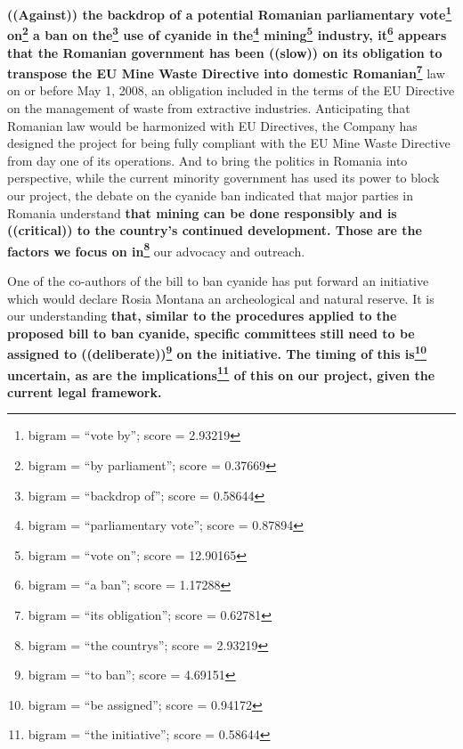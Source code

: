 \documentclass{article}
\begin{document}
 \textbf{((Against)) the backdrop of a potential Romanian parliamentary vote\footnote{bigram = ``vote by''; score = 2.93219} on\footnote{bigram = ``by parliament''; score = 0.37669} a ban on the\footnote{bigram = ``backdrop of''; score = 0.58644} use of cyanide in the\footnote{bigram = ``parliamentary vote''; score = 0.87894} mining\footnote{bigram = ``vote on''; score = 12.90165} industry, it\footnote{bigram = ``a ban''; score = 1.17288} appears that the Romanian government has been ((slow)) on its obligation to transpose the EU Mine Waste Directive into domestic Romanian\footnote{bigram = ``its obligation''; score = 0.62781}} law on or before May 1, 2008, an obligation included in the terms of the EU Directive on the management of waste from extractive industries. Anticipating that Romanian law would be harmonized with EU Directives, the Company has designed the project for being fully compliant with the EU Mine Waste Directive from day one of its operations. And to bring the politics in Romania into perspective, while the current minority government has used its power to block our project, the debate on the cyanide ban indicated that major parties in Romania understand \textbf{that mining can be done responsibly and is ((critical)) to the country's continued development. Those are the factors we focus on in\footnote{bigram = ``the countrys''; score = 2.93219}} our advocacy and outreach. 

 One of the co-authors of the bill to ban cyanide has put forward an initiative which would declare Rosia Montana an archeological and natural reserve. It is our understanding \textbf{that, similar to the procedures applied to the proposed bill to ban cyanide, specific committees still need to be assigned to ((deliberate))\footnote{bigram = ``to ban''; score = 4.69151} on the initiative. The timing of this is\footnote{bigram = ``be assigned''; score = 0.94172} uncertain, as are the implications\footnote{bigram = ``the initiative''; score = 0.58644} of this on our project, given the current legal framework.} 
\end{document}
